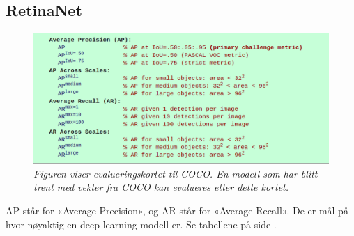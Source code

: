 
\subsection{RetinaNet}

\begin{figure}[h!]
\begin{center} 
\includegraphics[scale=0.35]{figures/coco}
\caption{\small \sl Figuren viser evalueringskortet til COCO. En modell som har blitt trent med vekter fra COCO kan evalueres etter dette kortet. \label{fig:coco}}
\end{center}
\end{figure}

AP står for «Average Precision», og AR står for «Average Recall». De er mål på hvor nøyaktig en deep learning modell er. Se tabellene på side \pageref{tab:ap_retinanet}.

